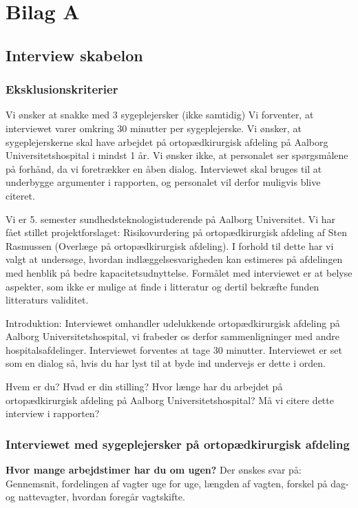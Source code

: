 \chapter{Bilag A}

\section{Interview skabelon}

\subsection{Eksklusionskriterier}
Vi ønsker at snakke med 3 sygeplejersker (ikke samtidig)
Vi forventer, at interviewet varer omkring 30 minutter per sygeplejerske.
Vi ønsker, at sygeplejerskerne skal have arbejdet på ortopædkirurgisk afdeling på Aalborg Universitetshospital i mindst 1 år.
Vi ønsker ikke, at personalet ser spørgsmålene på forhånd, da vi foretrækker en åben dialog.
Interviewet skal bruges til at underbygge argumenter i rapporten, og personalet vil derfor muligvis blive citeret.


Vi er 5. semester sundhedsteknologistuderende på Aalborg Universitet. Vi har fået stillet projektforslaget: Risikovurdering på ortopædkirurgisk afdeling af Sten Rasmussen (Overlæge på ortopædkirurgisk afdeling). I forhold til dette har vi valgt at undersøge, hvordan indlæggelsesvarigheden kan estimeres på afdelingen med henblik på bedre kapacitetsudnyttelse. Formålet med interviewet er at belyse aspekter, som ikke er mulige at finde i litteratur og dertil bekræfte funden litteraturs validitet.  


Introduktion:
Interviewet omhandler udelukkende ortopædkirurgisk afdeling på Aalborg Universitetshospital, vi frabeder os derfor sammenligninger med andre hospitalsafdelinger. Interviewet forventes at tage 30 minutter. Interviewet er set som en dialog så, hvis du har lyst til at byde ind undervejs er dette i orden.


Hvem er du?
Hvad er din stilling?
Hvor længe har du arbejdet på ortopædkirurgisk afdeling på Aalborg Universitetshospital?
Må vi citere dette interview i rapporten?

\subsection{Interviewet med sygeplejersker på ortopædkirurgisk afdeling}
\textbf{Hvor mange arbejdstimer har du om ugen?}
Der ønskes svar på: Gennemsnit, fordelingen af vagter uge for uge, længden af vagten, forskel på dag- og nattevagter, hvordan foregår vagtskifte. 

